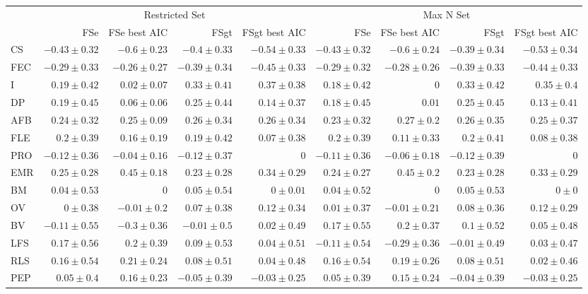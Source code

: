 \begin{landscape}
\begin{table}
\begin{footnotesize}
\begin{tabular}{@{}l|rrrr|rrrr@{}}
\toprule
  & \multicolumn{4}{c|}{Restricted Set} & \multicolumn{4}{c}{Max N Set}\\
  & FSe & FSe best AIC & FSgt & FSgt best AIC & FSe & FSe best AIC & FSgt & FSgt best AIC\\
\midrule
CS & $-0.43 \pm 0.32$ & $-0.6 \pm 0.23$ & $-0.4 \pm 0.33$ & $-0.54 \pm 0.33$ & $-0.43 \pm 0.32$ & $-0.6 \pm 0.24$ & $-0.39 \pm 0.34$ & $-0.53 \pm 0.34$\\
FEC & $-0.29 \pm 0.33$ & $-0.26 \pm 0.27$ & $-0.39 \pm 0.34$ & $-0.45 \pm 0.33$ & $-0.29 \pm 0.32$ & $-0.28 \pm 0.26$ & $-0.39 \pm 0.33$ & $-0.44 \pm 0.33$\\
I & $0.19 \pm 0.42$ & $0.02 \pm 0.07$ & $0.33 \pm 0.41$ & $0.37 \pm 0.38$ & $0.18 \pm 0.42$ & $0$ & $0.33 \pm 0.42$ & $0.35 \pm 0.4$\\
DP & $0.19 \pm 0.45$ & $0.06 \pm 0.06$ & $0.25 \pm 0.44$ & $0.14 \pm 0.37$ & $0.18 \pm 0.45$ & $0.01$ & $0.25 \pm 0.45$ & $0.13 \pm 0.41$\\
AFB & $0.24 \pm 0.32$ & $0.25 \pm 0.09$ & $0.26 \pm 0.34$ & $0.26 \pm 0.34$ & $0.23 \pm 0.32$ & $0.27 \pm 0.2$ & $0.26 \pm 0.35$ & $0.25 \pm 0.37$\\
FLE & $0.2 \pm 0.39$ & $0.16 \pm 0.19$ & $0.19 \pm 0.42$ & $0.07 \pm 0.38$ & $0.2 \pm 0.39$ & $0.11 \pm 0.33$ & $0.2 \pm 0.41$ & $0.08 \pm 0.38$\\
PRO & $-0.12 \pm 0.36$ & $-0.04 \pm 0.16$ & $-0.12 \pm 0.37$ & $0$ & $-0.11 \pm 0.36$ & $-0.06 \pm 0.18$ & $-0.12 \pm 0.39$ & $0$\\
EMR & $0.25 \pm 0.28$ & $0.45 \pm 0.18$ & $0.23 \pm 0.28$ & $0.34 \pm 0.29$ & $0.24 \pm 0.27$ & $0.45 \pm 0.2$ & $0.23 \pm 0.28$ & $0.33 \pm 0.29$\\
BM & $0.04 \pm 0.53$ & $0$ & $0.05 \pm 0.54$ & $0 \pm 0.01$ & $0.04 \pm 0.52$ & $0$ & $0.05 \pm 0.53$ & $0 \pm 0$\\
OV & $0 \pm 0.38$ & $-0.01 \pm 0.2$ & $0.07 \pm 0.38$ & $0.12 \pm 0.34$ & $0.01 \pm 0.37$ & $-0.01 \pm 0.21$ & $0.08 \pm 0.36$ & $0.12 \pm 0.29$\\
BV & $-0.11 \pm 0.55$ & $-0.3 \pm 0.36$ & $-0.01 \pm 0.5$ & $0.02 \pm 0.49$ & $0.17 \pm 0.55$ & $0.2 \pm 0.37$ & $0.1 \pm 0.52$ & $0.05 \pm 0.48$\\
LFS & $0.17 \pm 0.56$ & $0.2 \pm 0.39$ & $0.09 \pm 0.53$ & $0.04 \pm 0.51$ & $-0.11 \pm 0.54$ & $-0.29 \pm 0.36$ & $-0.01 \pm 0.49$ & $0.03 \pm 0.47$\\
RLS & $0.16 \pm 0.54$ & $0.21 \pm 0.24$ & $0.08 \pm 0.51$ & $0.04 \pm 0.48$ & $0.16 \pm 0.54$ & $0.19 \pm 0.26$ & $0.08 \pm 0.51$ & $0.02 \pm 0.46$\\
PEP & $0.05 \pm 0.4$ & $0.16 \pm 0.23$ & $-0.05 \pm 0.39$ & $-0.03 \pm 0.25$ & $0.05 \pm 0.39$ & $0.15 \pm 0.24$ & $-0.04 \pm 0.39$ & $-0.03 \pm 0.25$\\
\bottomrule
\end{tabular}

\end{footnotesize}
\end{table}
\end{landscape}%





